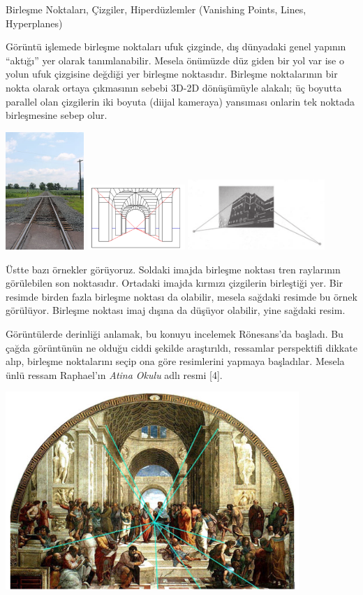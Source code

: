 \documentclass[12pt,fleqn]{article}\usepackage{../../common}
\begin{document}
Birleşme Noktaları, Çizgiler, Hiperdüzlemler (Vanishing Points, Lines, Hyperplanes)

Görüntü işlemede birleşme noktaları ufuk çizginde, dış dünyadaki genel
yapının ``aktığı'' yer olarak tanımlanabilir. Mesela önümüzde düz giden bir
yol var ise o yolun ufuk çizgisine değdiği yer birleşme
noktasıdır. Birleşme noktalarının bir nokta olarak ortaya çıkmasının sebebi
3D-2D dönüşümüyle alakalı; üç boyutta parallel olan çizgilerin iki boyuta
(diijal kameraya) yansıması onlarin tek noktada birleşmesine sebep olur.

\includegraphics[width=8em]{vision_40lines_05.png}
\includegraphics[width=10em]{vision_40lines_07.png}
\includegraphics[width=14em]{vision_40lines_10.png}

Üstte bazı örnekler görüyoruz. Soldaki imajda birleşme noktası tren
raylarının görülebilen son noktasıdır. Ortadaki imajda kırmızı çizgilerin
birleştiği yer. Bir resimde birden fazla birleşme noktası da olabilir,
mesela sağdaki resimde bu örnek görülüyor. Birleşme noktası imaj dışına da
düşüyor olabilir, yine sağdaki resim.

Görüntülerde derinliği anlamak, bu konuyu incelemek Rönesans'da başladı. Bu
çağda görüntünün ne olduğu ciddi şekilde araştırıldı, ressamlar perspektifi
dikkate alıp, birleşme noktalarını seçip ona göre resimlerini yapmaya
başladılar. Mesela ünlü ressam Raphael'ın {\em Atina Okulu} adlı resmi [4].

\includegraphics[width=30em]{athens.jpg}
\end{document}
